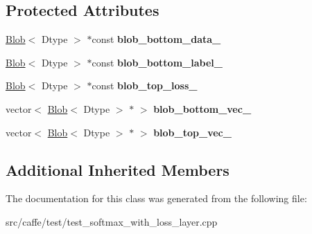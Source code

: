 \subsection*{Protected Attributes}
\begin{DoxyCompactItemize}
\item 
\mbox{\label{classcaffe_1_1_softmax_with_loss_layer_test_a49cdcd271057f2761d41da4a7fee58cc}} 
\mbox{\hyperlink{classcaffe_1_1_blob}{Blob}}$<$ Dtype $>$ $\ast$const {\bfseries blob\+\_\+bottom\+\_\+data\+\_\+}
\item 
\mbox{\label{classcaffe_1_1_softmax_with_loss_layer_test_a2aa7060b3314d6c6cfa78b58b75e0b7e}} 
\mbox{\hyperlink{classcaffe_1_1_blob}{Blob}}$<$ Dtype $>$ $\ast$const {\bfseries blob\+\_\+bottom\+\_\+label\+\_\+}
\item 
\mbox{\label{classcaffe_1_1_softmax_with_loss_layer_test_a7b434d08f5480a56ff4662211a31dbf3}} 
\mbox{\hyperlink{classcaffe_1_1_blob}{Blob}}$<$ Dtype $>$ $\ast$const {\bfseries blob\+\_\+top\+\_\+loss\+\_\+}
\item 
\mbox{\label{classcaffe_1_1_softmax_with_loss_layer_test_a4670285f7fe82bec0f67ca57f3de2536}} 
vector$<$ \mbox{\hyperlink{classcaffe_1_1_blob}{Blob}}$<$ Dtype $>$ $\ast$ $>$ {\bfseries blob\+\_\+bottom\+\_\+vec\+\_\+}
\item 
\mbox{\label{classcaffe_1_1_softmax_with_loss_layer_test_a64833e091e21939243f8e8e1bd4750c2}} 
vector$<$ \mbox{\hyperlink{classcaffe_1_1_blob}{Blob}}$<$ Dtype $>$ $\ast$ $>$ {\bfseries blob\+\_\+top\+\_\+vec\+\_\+}
\end{DoxyCompactItemize}
\subsection*{Additional Inherited Members}


The documentation for this class was generated from the following file\+:\begin{DoxyCompactItemize}
\item 
src/caffe/test/test\+\_\+softmax\+\_\+with\+\_\+loss\+\_\+layer.\+cpp\end{DoxyCompactItemize}
